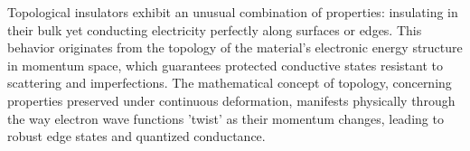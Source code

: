 Topological insulators exhibit an unusual combination of properties: insulating in their bulk yet conducting electricity perfectly along surfaces or edges. This behavior originates from the topology of the material's electronic energy structure in momentum space, which guarantees protected conductive states resistant to scattering and imperfections. The mathematical concept of topology, concerning properties preserved under continuous deformation, manifests physically through the way electron wave functions 'twist' as their momentum changes, leading to robust edge states and quantized conductance. 
